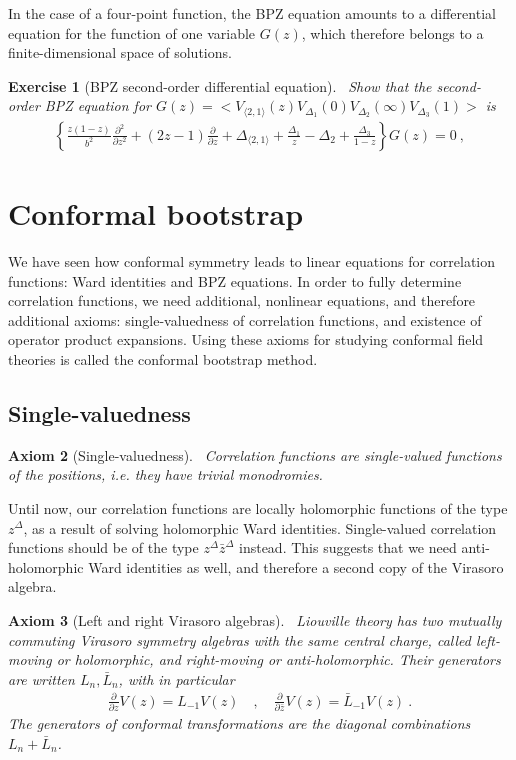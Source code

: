 \documentclass[12pt, a4paper]{article}
\theoremstyle{break}
\newtheorem{exo}{Exercise}[section]
\newtheorem{hyp}[exo]{Axiom}
\begin{document}
In the case of a four-point function, the BPZ equation amounts to a differential equation for the function of one variable $G(z)$, which therefore belongs to a finite-dimensional space of solutions.

\begin{exo}[BPZ second-order differential equation]
 ~\label{exo:bpz}
 Show that the second-order BPZ equation for $G(z)=\Big< V_{\langle 2, 1 \rangle}(z) V_{\Delta_1}(0)V_{\Delta_2}(\infty)V_{\Delta_3}(1) \Big>$ is
 \begin{align}
  \left\{ \frac{z(1-z)}{b^2}\frac{\partial^2}{\partial z^2} + (2z-1){\frac{\partial}{\partial z}} +\Delta_{\langle 2,1 \rangle} +\frac{\Delta_1}{z}-\Delta_2 + \frac{\Delta_3}{1-z}\right\} G(z)=0\ ,
\label{eq:ode}
 \end{align}
\end{exo}


\section{Conformal bootstrap}

We have seen how conformal symmetry leads to linear equations for correlation functions: Ward identities and BPZ equations. 
In order to fully determine correlation functions, we need additional, nonlinear equations, and therefore additional axioms: single-valuedness of correlation functions, and existence of operator product expansions. 
Using these axioms for studying conformal field theories is called the conformal bootstrap method. 

\subsection{Single-valuedness}

\begin{hyp}[Single-valuedness]
 ~\label{hyp:sv}
 Correlation functions are single-valued functions of the positions, i.e. they have trivial monodromies.
\end{hyp}

Until now, our correlation functions are locally holomorphic functions of the type $z^\Delta$, as a result of solving holomorphic Ward identities. Single-valued correlation functions should be of the type $z^\Delta \bar z^\Delta$ instead. 
This suggests that we need anti-holomorphic Ward identities as well, and therefore a second copy of the Virasoro algebra.

\begin{hyp}[Left and right Virasoro algebras]
 ~\label{hyp:lr}
 Liouville theory has two mutually commuting Virasoro symmetry algebras with the same central charge, called left-moving or holomorphic, and right-moving or anti-holomorphic. Their generators are written $L_n,\bar L_n$, with in particular
 \begin{align}
  \frac{\partial}{\partial z} V(z) = L_{-1}V(z)   \quad , \quad \frac{\partial}{\partial \bar z} V(z)= \bar L_{-1} V(z)   \ .
 \end{align}
 The generators of conformal transformations are the diagonal combinations $L_n+\bar L_n$.
\end{hyp}
\end{document}
